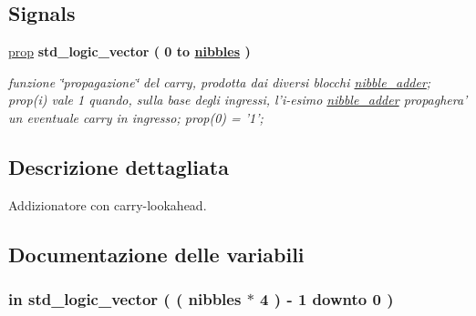 \subsection*{Signals}
 \begin{DoxyCompactItemize}
\item 
\hyperlink{group___carry_loockahead_ga19afe0b89973d7fc29362431f2e828b7}{prop} {\bfseries \textcolor{vhdlchar}{std\+\_\+logic\+\_\+vector}\textcolor{vhdlchar}{ }\textcolor{vhdlchar}{(}\textcolor{vhdlchar}{ }\textcolor{vhdlchar}{ } \textcolor{vhdldigit}{0} \textcolor{vhdlchar}{ }\textcolor{vhdlchar}{to}\textcolor{vhdlchar}{ }\textcolor{vhdlchar}{ }\textcolor{vhdlchar}{ }\textcolor{vhdlchar}{ }{\bfseries \hyperlink{group___carry_loockahead_ga0b63b586531492d0fa882246cca071c1}{nibbles}} \textcolor{vhdlchar}{ }\textcolor{vhdlchar}{)}\textcolor{vhdlchar}{ }} 
\begin{DoxyCompactList}\small\item\em funzione \char`\"{}propagazione\char`\"{} del carry, prodotta dai diversi blocchi \hyperlink{classnibble__adder}{nibble\+\_\+adder}; prop(i) vale 1 quando, sulla base degli ingressi, l'i-\/esimo \hyperlink{classnibble__adder}{nibble\+\_\+adder} propaghera' un eventuale carry in ingresso; prop(0) = '1'; \end{DoxyCompactList}\end{DoxyCompactItemize}


\subsection{Descrizione dettagliata}
Addizionatore con carry-\/lookahead. 



\subsection{Documentazione delle variabili}
\hypertarget{group___carry_loockahead_gae4a2e124144a2f35270a55f0cf32a5ee}{
\subsubsection[{addendum1}]{ {\bfseries \textcolor{vhdlchar}{in}\textcolor{vhdlchar}{ }} {\bfseries \textcolor{vhdlchar}{std\+\_\+logic\+\_\+vector}\textcolor{vhdlchar}{ }\textcolor{vhdlchar}{(}\textcolor{vhdlchar}{ }\textcolor{vhdlchar}{(}\textcolor{vhdlchar}{ }\textcolor{vhdlchar}{ }\textcolor{vhdlchar}{ }\textcolor{vhdlchar}{ }{\bfseries {\bf nibbles}} \textcolor{vhdlchar}{$\ast$}\textcolor{vhdlchar}{ } \textcolor{vhdldigit}{4} \textcolor{vhdlchar}{ }\textcolor{vhdlchar}{)}\textcolor{vhdlchar}{ }\textcolor{vhdlchar}{-\/}\textcolor{vhdlchar}{ } \textcolor{vhdldigit}{1} \textcolor{vhdlchar}{ }\textcolor{vhdlchar}{downto}\textcolor{vhdlchar}{ }\textcolor{vhdlchar}{ } \textcolor{vhdldigit}{0} \textcolor{vhdlchar}{ }\textcolor{vhdlchar}{)}\textcolor{vhdlchar}{ }} \hspace{0.3cm}{\ttfamily [Port]}}}\label{group___carry_loockahead_gae4a2e124144a2f35270a55f0cf32a5ee}


